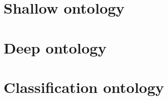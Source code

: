 \documentclass{article}
\begin{document}
\tableofcontents

\pagebreak

\section{Shallow ontology}



{

\newcommand{\categoryfile}[1]{}



}

\section{Deep ontology}

{

\newcommand{\categoryfile}[1]{}



}

\section{Classification ontology}

{

\newcommand{\categoryfile}[1]{}



}
\end{document}
